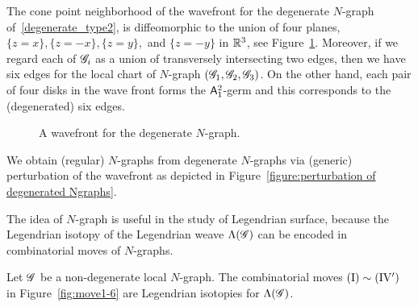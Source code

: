 \begin{remark}
The cone point neighborhood of the wavefront for the degenerate $N$-graph of~\ref{degenerate_type2}, is diffeomorphic to the union of four planes, $\{z=x\}, \{z=-x\}, \{z=y\},$ and $\{z=-y\}$ in $\mathbb{R}^3$, see Figure~\ref{fig:degenerated N-graph}.
Moreover, if we regard each of $\mathscr{G}_i$ as a union of transversely intersecting two edges, then we have six edges for the local chart of $N$-graph $(\mathscr{G}_1,\mathscr{G}_2,\mathscr{G}_3)$.
On the other hand, each pair of four disks in the wave front forms the $\mathsf{A}_1^2$-germ and this corresponds to the (degenerated) six edges.
\end{remark}


\begin{figure}[ht]
\caption{A wavefront for the degenerate $N$-graph.}
\label{fig:degenerated N-graph}
\end{figure}


We obtain (regular) $N$-graphs from degenerate $N$-graphs via (generic) perturbation of the wavefront as depicted in Figure~\ref{figure:perturbation of degenerated Ngraphs}.



The idea of $N$-graph is useful in the study of Legendrian surface, because the Legendrian isotopy of the Legendrian weave $\Lambda(\mathscr{G})$ can be encoded in combinatorial moves of $N$-graphs.

\begin{theorem}\cite[Theorem~1.1]{CZ2020}\label{thm:N-graph moves and legendrian isotopy}
Let $\mathscr{G}$ be a non-degenerate local $N$-graph. The combinatorial moves ${\rm{(I)}}\sim {\rm{(IV')}}$ in Figure~\ref{fig:move1-6} are Legendrian isotopies for $\Lambda(\mathscr{G})$.
\end{theorem}

